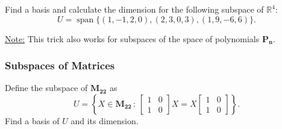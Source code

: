 \documentclass[20pt,a4paper]{extarticle}
\DeclareMathOperator{\Span}{span}
\newcounter{example}
\begin{document}
\begin{example}
Find a basis and calculate the dimension for the following subspace of $\mathbb{R}^4$:
	\[
		U = \Span \{ (1, -1, 2, 0) , (2, 3, 0, 3) , (1, 9, -6, 6) \} .
	\]
\end{example}

\begin{solution}

\end{solution}

\newpage 

\phantom{2}

\vfill 

\underline{Note:} This trick also works for subspaces of the space of polynomials $\mathbf{P_n}$.

\newpage 

\subsubsection{Subspaces of Matrices}

\begin{example}
Define the subspace of $\mathbf{M_{22}}$ as
	\[
		U = \left\{ X \in \mathbf{M_{22}} \, : \, \begin{bmatrix} 1 & 0 \\ 1 & 0 \end{bmatrix} X = X \begin{bmatrix} 1 & 0 \\ 1 & 0 \end{bmatrix} \right\} .
	\]
Find a basis of $U$ and its dimension.
\end{example}

\begin{solution}

\end{solution}

\newpage 

\phantom{2}
\end{document}
